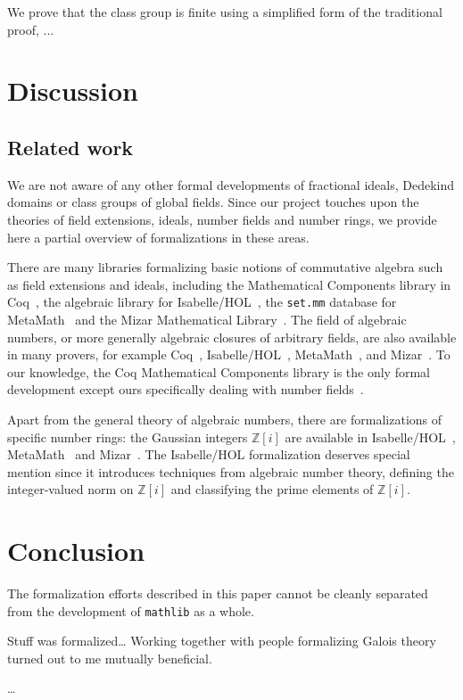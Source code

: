 \documentclass[a4paper,USenglish,cleveref, autoref, thm-restate]{lipics-v2021}
\newcommand{\mathlib}{\texttt{mathlib}\xspace}
\newcommand{\Z}{\mathbb{Z}}
\begin{document}
We prove that the class group is finite using a simplified form of the traditional proof, ...

\section{Discussion}

\subsection{Related work}

We are not aware of any other formal developments of fractional ideals, Dedekind domains or class groups of global fields.
Since our project touches upon the theories of field extensions, ideals, number fields and number rings,
we provide here a partial overview of formalizations in these areas.

There are many libraries formalizing basic notions of commutative algebra such as field extensions and ideals, including the Mathematical Components library in Coq~\cite{mathcomp}, the algebraic library for Isabelle/HOL~\cite{algebra_isabelle}, the \texttt{set.mm} database for MetaMath~\cite{metamath} and the Mizar Mathematical Library~\cite{algebraic-hierarchy_mizar}. The field of algebraic numbers, or more generally algebraic closures of arbitrary fields, are also available in many provers, for example Coq~\cite{real-algebraic-numbers-coq, mathcomp}, Isabelle/HOL~\cite{algebraic-numbers-isabelle}, MetaMath~\cite{algebraic-numbers-metamath}, and Mizar~\cite{algebraic-numbers-mizar}. To our knowledge, the Coq Mathematical Components library is the only formal development except ours specifically dealing with number fields~\cite[\texttt{field/algnum.v}]{mathcomp}.

Apart from the general theory of algebraic numbers, there are formalizations of specific number rings: the Gaussian integers $\Z[i]$ are available in Isabelle/HOL~\cite{gaussian_integers-isabelle}, MetaMath~\cite{gaussian_integers-metamath} and Mizar~\cite{gaussian_integers-mizar}.
The Isabelle/HOL formalization deserves special mention since it introduces techniques from algebraic number theory,
defining the integer-valued norm on $\Z[i]$ and classifying the prime elements of $\Z[i]$.

\section{Conclusion}

The formalization efforts described in this paper cannot be cleanly separated from the development of \mathlib as a whole.

Stuff was formalized\ldots
Working together with people formalizing Galois theory turned out to me mutually beneficial.

\ldots
 



\end{document}
